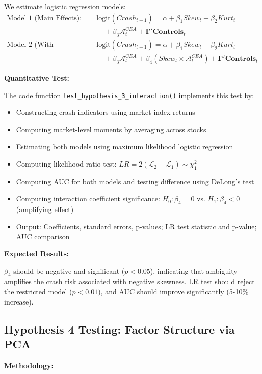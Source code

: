 \documentclass[preprint,12pt,authoryear]{elsarticle}
\begin{document}
We estimate logistic regression models:
\begin{align}
\text{Model 1 (Main Effects):} \quad & \text{logit}(Crash_{t+1}) = \alpha + \beta_1 Skew_t + \beta_2 Kurt_t \nonumber \\
& \quad + \beta_3 \mathcal{A}^{CEA}_t + \mathbf{\Gamma}'\mathbf{Controls}_t \\
\text{Model 2 (With Interaction):} \quad & \text{logit}(Crash_{t+1}) = \alpha + \beta_1 Skew_t + \beta_2 Kurt_t \nonumber \\
& \quad + \beta_3 \mathcal{A}^{CEA}_t + \beta_4 (Skew_t \times \mathcal{A}^{CEA}_t) + \mathbf{\Gamma}'\mathbf{Controls}_t
\end{align}

\noindent
\textbf{Quantitative Test:}

The code function \texttt{test\_hypothesis\_3\_interaction()} implements this test by:
\begin{itemize}
\item Constructing crash indicators using market index returns
\item Computing market-level moments by averaging across stocks
\item Estimating both models using maximum likelihood logistic regression
\item Computing likelihood ratio test: $LR = 2(\mathcal{L}_2 - \mathcal{L}_1) \sim \chi^2_1$
\item Computing AUC for both models and testing difference using DeLong's test
\item Computing interaction coefficient significance: $H_0: \beta_4 = 0$ vs. $H_1: \beta_4 < 0$ (amplifying effect)
\item Output: Coefficients, standard errors, p-values; LR test statistic and p-value; AUC comparison
\end{itemize}

\noindent
\textbf{Expected Results:}

$\beta_4$ should be negative and significant ($p < 0.05$), indicating that ambiguity amplifies the crash risk associated with negative skewness. LR test should reject the restricted model ($p < 0.01$), and AUC should improve significantly (5-10\% increase).

\subsection{Hypothesis 4 Testing: Factor Structure via PCA}

\noindent
\textbf{Methodology:}
\end{document}

